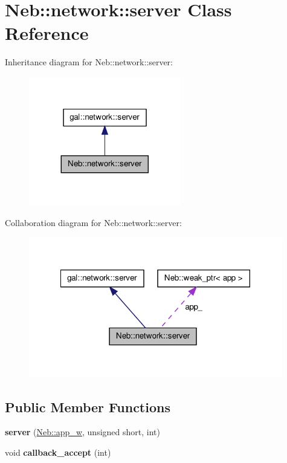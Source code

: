 \hypertarget{classNeb_1_1network_1_1server}{\section{\-Neb\-:\-:network\-:\-:server \-Class \-Reference}
\label{classNeb_1_1network_1_1server}
}


\-Inheritance diagram for \-Neb\-:\-:network\-:\-:server\-:\nopagebreak
\begin{figure}[H]
\begin{center}
\leavevmode
\includegraphics[width=188pt]{classNeb_1_1network_1_1server__inherit__graph}
\end{center}
\end{figure}


\-Collaboration diagram for \-Neb\-:\-:network\-:\-:server\-:\nopagebreak
\begin{figure}[H]
\begin{center}
\leavevmode
\includegraphics[width=314pt]{classNeb_1_1network_1_1server__coll__graph}
\end{center}
\end{figure}
\subsection*{\-Public \-Member \-Functions}
\begin{DoxyCompactItemize}
\item 
\hypertarget{classNeb_1_1network_1_1server_a659202ed9841db75015dfdf0355a0de1}{{\bfseries server} (\hyperlink{classNeb_1_1weak__ptr}{\-Neb\-::app\-\_\-w}, unsigned short, int)}\label{classNeb_1_1network_1_1server_a659202ed9841db75015dfdf0355a0de1}

\item 
\hypertarget{classNeb_1_1network_1_1server_a63a9c9b2984b04fb7799c43d2e2d73e9}{void {\bfseries callback\-\_\-accept} (int)}\label{classNeb_1_1network_1_1server_a63a9c9b2984b04fb7799c43d2e2d73e9}

\end{DoxyCompactItemize}
